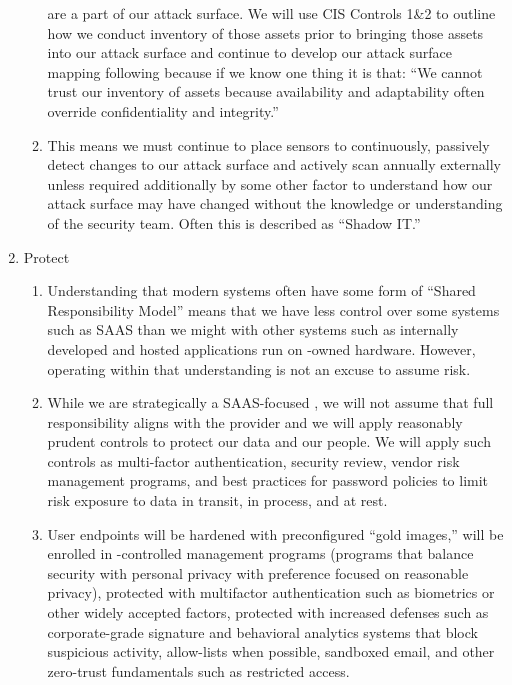 \documentclass[../main.tex]{subfiles}
\begin{document}
\begin{enumerate}
\begin{enumerate}
        are a part of our attack surface. We will use CIS Controls 1\&2 to outline how we conduct inventory of those assets prior to bringing those assets into our attack surface and continue to
        develop our attack surface mapping following because if we know one thing it is that: “We cannot trust our inventory of assets because availability and adaptability often override
        confidentiality and integrity.”
        \item This means we must continue to place sensors to continuously, passively detect changes to our attack surface and actively scan annually externally unless required additionally by
        some other factor to understand how our attack surface may have changed without the knowledge or understanding of the security team. Often this is described as “Shadow IT.”
    \end{enumerate}
    \item Protect
    \begin{enumerate}
        \item Understanding that modern systems often have some form of “Shared Responsibility Model” means that we have less control over some systems such as SAAS than we might with other
        systems such as internally developed and hosted applications run on \CompanyName{}-owned hardware. However, operating within that understanding is not an excuse to assume risk.
        \item While we are strategically a SAAS-focused \CompanyName{}, we will not assume that full responsibility aligns with the provider and we will apply reasonably prudent controls to protect our
        data and our people. We will apply such controls as multi-factor authentication, security review, vendor risk management programs, and best practices for password policies to limit risk
        exposure to data in transit, in process, and at rest.
        \item User endpoints will be hardened with preconfigured “gold images,” will be enrolled in \CompanyName{}-controlled management programs (programs that balance security with personal privacy
        with preference focused on reasonable privacy), protected with multifactor authentication such as biometrics or other widely accepted factors, protected with increased defenses such as
        corporate-grade signature and behavioral analytics systems that block suspicious activity, allow-lists when possible, sandboxed email, and other zero-trust fundamentals such as restricted
        access.
    \end{enumerate}

\end{enumerate}
\end{document}
